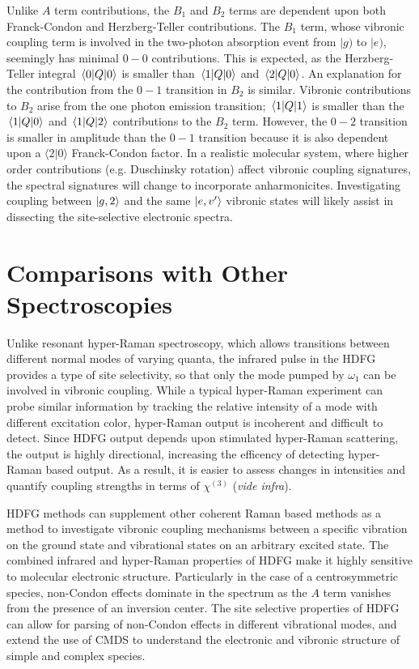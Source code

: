 \documentclass[aip, jcp, reprint, twocolumn]{revtex4-2}
\begin{document}
Unlike $A$ term contributions, the $B_1$ and $B_2$ terms are dependent upon both Franck-Condon and Herzberg-Teller contributions.
The $B_1$ term, whose vibronic coupling term is involved in the two-photon absorption event from $|g)$ to $|e)$, seemingly has minimal $0-0$ contributions. 
This is expected, as the Herzberg-Teller integral $\mel{0}{Q}{0}$ is smaller than $\mel{1}{Q}{0}$ and $\mel{2}{Q}{0}$. 
An explanation for the contribution from the $0-1$ transition in $B_2$ is similar.
Vibronic contributions to $B_2$ arise from the one photon emission transition; $\mel{1}{Q}{1}$ is smaller than the $\mel{1}{Q}{0}$ and $\mel{1}{Q}{2}$ contributions to the $B_2$ term.
However, the $0-2$ transition is smaller in amplitude than the $0-1$ transition because it is also dependent upon a $\langle 2 | 0 \rangle$ Franck-Condon factor.
In a realistic molecular system, where higher order contributions (e.g. Duschinsky rotation) affect vibronic coupling signatures, the spectral signatures will change to incorporate anharmonicites. \cite{Duschinsky1937, Carlson1990, Kundu2022}
Investigating coupling between $\ket{g,2}$ and the same $\ket{e,v'}$ vibronic states will likely assist in dissecting the site-selective electronic spectra.

\section{Comparisons with Other Spectroscopies}\label{quant}
Unlike resonant hyper-Raman spectroscopy, which allows transitions between different normal modes of varying quanta, the infrared pulse in the HDFG provides a type of site selectivity,\cite{RN103, Carlson1991} so that only the mode pumped by $\omega_1$ can be involved in vibronic coupling. 
While a typical hyper-Raman experiment can probe similar information by tracking the relative intensity of a mode with different excitation color, hyper-Raman output is incoherent and difficult to detect. \cite{Kelley2010}
Since HDFG output depends upon stimulated hyper-Raman scattering, the output is highly directional, increasing the efficency of detecting hyper-Raman based output. 
As a result, it is easier to assess changes in intensities and quantify coupling strengths in terms of $\chi^{(3)}$ (\textit{vide infra}).

HDFG methods can supplement other coherent Raman based methods as a method to investigate vibronic coupling mechanisms between a specific vibration on the ground state and vibrational states on an arbitrary excited state.\cite{RN103}
The combined infrared and hyper-Raman properties of HDFG make it highly sensitive to molecular electronic structure.
Particularly in the case of a centrosymmetric species, non-Condon effects dominate in the spectrum as the $A$ term vanishes from the presence of an inversion center.
The site selective properties of HDFG can allow for parsing of non-Condon effects in different vibrational modes, and extend the use of CMDS to understand the electronic and vibronic structure of simple and complex species.
\end{document}
